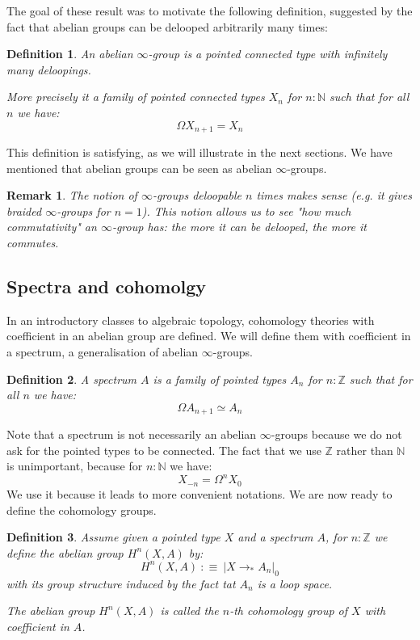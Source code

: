 \documentclass{article}
\newcommand{\sse}[1]{\medbreak \subsection{#1}}
\renewcommand{\r}{\rightarrow}
\newtheorem{definition}{Definition}
\newtheorem{remark}{Remark}
\begin{document}
The goal of these result was to motivate the following definition, suggested by the fact that abelian groups can be delooped arbitrarily many times:

\begin{definition}
An abelian $\infty$-group is a pointed connected type with infinitely many deloopings. 

More precisely it a family of pointed connected types $X_n$ for $n:\mathbb{N}$ such that for all $n$ we have:
\[\Omega X_{n+1} = X_n\]
\end{definition}

This definition is satisfying, as we will illustrate in the next sections. We have mentioned that abelian groups can be seen as abelian $\infty$-groups.

\begin{remark}
The notion of $\infty$-groups deloopable $n$ times makes sense (e.g. it gives braided $\infty$-groups for $n=1$). This notion allows us to see "how much commutativity" an $\infty$-group has: the more it can be delooped, the more it commutes.
\end{remark}




\sse{Spectra and cohomolgy}

In an introductory classes to algebraic topology, cohomology theories with coefficient in an abelian group are defined. We will define them with coefficient in a spectrum, a generalisation of abelian $\infty$-groups.%

\begin{definition}
A spectrum $A$ is a family of pointed types $A_n$ for $n:\mathbb{Z}$ such that for all $n$ we have:
\[\Omega A_{n+1} \simeq A_n\]
\end{definition}

Note that a spectrum is not necessarily an abelian $\infty$-groups because we do not ask for the pointed types to be connected. The fact that we use $\mathbb{Z}$ rather than $\mathbb{N}$ is unimportant, because for $n:\mathbb{N}$ we have: 
\[X_{-n} = \Omega^n X_0\]
We use it because it leads to more convenient notations. We are now ready to define the cohomology groups.

\begin{definition}
Assume given a pointed type $X$ and a spectrum $A$, for $n:\mathbb{Z}$ we define the abelian group $H^n(X,A)$ by: 
\[H^n(X,A)\ :\equiv\ |X\r_* A_n|_0\]
with its group structure induced by the fact tat $A_n$ is a loop space.

The abelian group $H^n(X,A)$ is called the $n$-th cohomology group of $X$ with coefficient in $A$.
\end{definition}
\end{document}
